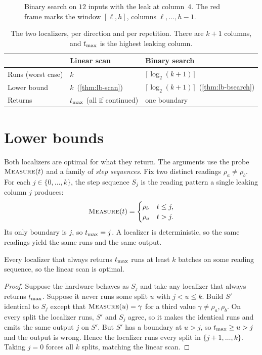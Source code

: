 \begin{figure}[p]
\centering
\fitwidth{}
\caption{Binary search on $12$ inputs with the leak at column~$4$. The red frame marks the window
$[\ell,h]$, columns $\ell,\dots,h-1$.}
\label{fig:binsearch}
\end{figure}

\begin{table}[t]
\centering\small
\setlength{\tabcolsep}{8pt}
\caption{The two localizers, per direction and per repetition. There are $k+1$ columns, and $t_{\max}$
is the highest leaking column.}
\label{tab:loc-compare}
\begin{tabular}{@{}lll@{}}
\toprule
 & Linear scan & Binary search \\
\midrule
Runs (worst case) & $k$ & $\lceil\log_2(k{+}1)\rceil$ \\
Lower bound & $k$~(\autoref{thm:lb-scan}) & $\lceil\log_2(k{+}1)\rceil$~(\autoref{thm:lb-bsearch}) \\
Returns & $t_{\max}$ (all if continued) & one boundary \\
\bottomrule
\end{tabular}
\end{table}

\section{Lower bounds}
\label{app:loc-lower}

Both localizers are optimal for what they return. The arguments use the probe $\textsc{Measure}(t)$
and a family of \emph{step sequences}. Fix two distinct readings $\rho_a\neq\rho_b$. For each
$j\in\{0,\dots,k\}$, the step sequence $S_j$ is the reading pattern a single leaking column $j$
produces:
\[
  \textsc{Measure}(t)=\begin{cases}\rho_b & t\le j,\\ \rho_a & t>j.\end{cases}
\]
Its only boundary is $j$, so $t_{\max}=j$. A localizer is deterministic, so the same readings yield the
same runs and the same output.

\begin{theorem}
\label{thm:lb-scan}
Every localizer that always returns $t_{\max}$ runs at least $k$ batches on some reading sequence, so
the linear scan is optimal.
\end{theorem}
\begin{proof}
Suppose the hardware behaves as $S_j$ and take any localizer that always returns $t_{\max}$. Suppose it
never runs some split $u$ with $j<u\le k$. Build $S'$ identical to $S_j$ except that
$\textsc{Measure}(u)=\gamma$ for a third value $\gamma\neq\rho_a,\rho_b$. On every split the
localizer runs, $S'$ and $S_j$ agree, so it makes the identical runs and emits the same output $j$
on $S'$. But $S'$ has a boundary at $u>j$, so $t_{\max}\ge u>j$ and the output is wrong. Hence the
localizer runs every split in $\{j{+}1,\dots,k\}$. Taking $j=0$ forces all $k$ splits, matching the
linear scan.
\end{proof}

